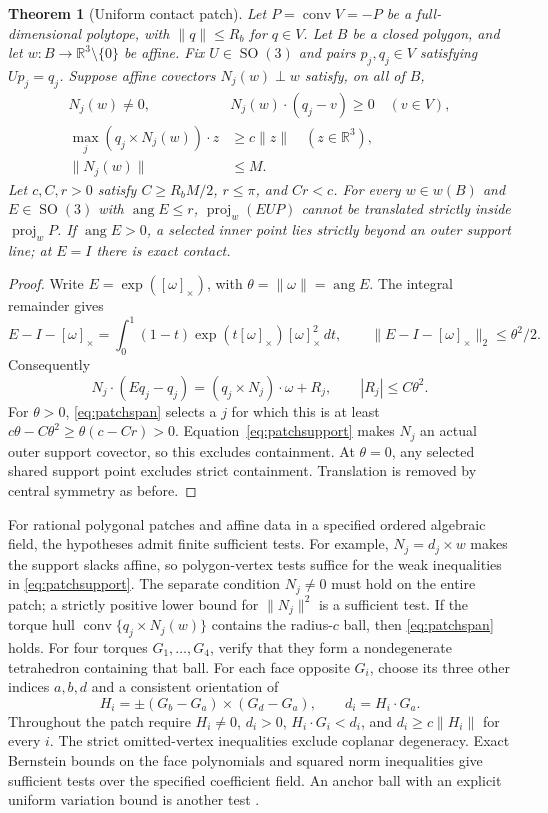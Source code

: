 \documentclass[11pt]{amsart}
\newcommand{\R}{\mathbb R}
\newcommand{\SO}{\operatorname{SO}}
\newcommand{\conv}{\operatorname{conv}}
\newcommand{\ang}{\operatorname{ang}}
\newcommand{\proj}{\operatorname{proj}}
\newcommand{\norm}[1]{\lVert#1\rVert}
\newcommand{\cross}[1]{[#1]_\times}
\newtheorem{theorem}{Theorem}[section]
\theoremstyle{definition}
\theoremstyle{remark}
\begin{document}
\begin{theorem}[Uniform contact patch]\label{thm:patch}
Let $P=\conv V=-P$ be a full-dimensional polytope, with
$\norm q\le R_b$ for $q\in V$. Let $B$ be a closed polygon, and let
$w:B\to\R^3\setminus\{0\}$ be affine. Fix $U\in\SO(3)$ and pairs
$p_j,q_j\in V$ satisfying $Up_j=q_j$. Suppose affine covectors
$N_j(w)\perp w$ satisfy, on all of $B$,
\begin{align}
 N_j(w)\ne0,\qquad &N_j(w)\cdot(q_j-v)\ge0\quad(v\in V),\label{eq:patchsupport}\\
 \max_j(q_j\times N_j(w))\cdot z&\ge c\norm z\quad(z\in\R^3),\label{eq:patchspan}\\
 \norm{N_j(w)}&\le M.\label{eq:patchnorm}
\end{align}
Let $c,C,r>0$ satisfy $C\ge R_bM/2$, $r\le\pi$, and $Cr<c$.
For every $w\in w(B)$ and $E\in\SO(3)$ with $\ang E\le r$,
$\proj_w(EUP)$ cannot be translated strictly inside $\proj_wP$.
If $\ang E>0$, a selected inner point lies strictly beyond an outer
support line; at $E=I$ there is exact contact.
\end{theorem}
\begin{proof}
Write $E=\exp(\cross\omega)$, with $\theta=\norm\omega=\ang E$.
The integral remainder gives
\[
 E-I-\cross\omega
 =\int_0^1(1-t)\exp(t\cross\omega)\cross\omega^2\,dt,
 \qquad \norm{E-I-\cross\omega}_2\le\theta^2/2.
\]
Consequently
\[
 N_j\cdot(Eq_j-q_j)
  =(q_j\times N_j)\cdot\omega+R_j,
       \qquad |R_j|\le C\theta^2.
\]
For $\theta>0$, \eqref{eq:patchspan} selects a $j$ for which this is at
least $c\theta-C\theta^2\ge\theta(c-Cr)>0$.
Equation~\eqref{eq:patchsupport} makes $N_j$ an actual outer support
covector, so this excludes containment. At $\theta=0$, any selected
shared support point excludes strict containment. Translation is removed
by central symmetry as before.
\end{proof}

For rational polygonal patches and affine data in a specified ordered
algebraic field, the hypotheses admit finite sufficient tests.
For example, $N_j=d_j\times w$ makes the support slacks affine, so
polygon-vertex tests suffice for the weak inequalities in
\eqref{eq:patchsupport}. The separate condition $N_j\ne0$ must hold on
the entire patch; a strictly positive lower bound for $\norm{N_j}^2$
is a sufficient test. If the torque hull
$\conv\{q_j\times N_j(w)\}$ contains the radius-$c$ ball, then
\eqref{eq:patchspan} holds. For four torques $G_1,\ldots,G_4$, verify
that they form a nondegenerate tetrahedron containing that ball.
For each face opposite $G_i$, choose its three other indices $a,b,d$
and a consistent orientation of
\[
 H_i=\pm(G_b-G_a)\times(G_d-G_a),\qquad d_i=H_i\cdot G_a.
\]
Throughout the patch require $H_i\ne0$, $d_i>0$,
$H_i\cdot G_i<d_i$, and $d_i\ge c\norm{H_i}$ for every $i$.
The strict omitted-vertex inequalities exclude coplanar degeneracy.
Exact Bernstein bounds on the face polynomials and squared norm
inequalities give sufficient tests over the specified coefficient field.
An anchor ball with an explicit uniform variation bound is another test
\cite{patch}.
\end{document}
